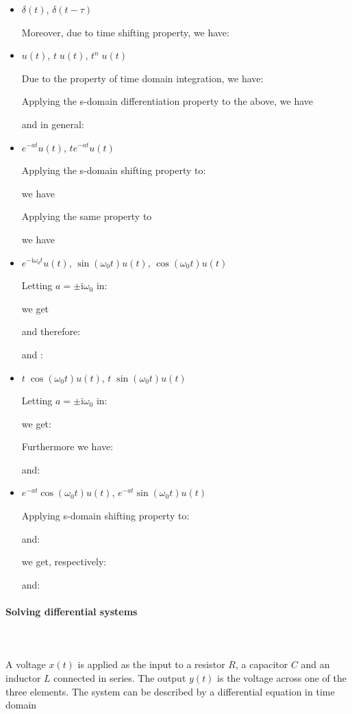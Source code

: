 	\begin{itemize}
	\item $\delta(t)$, $\delta(t-\tau)$
	
	
	Moreover, due to time shifting property, we have:
	
	
	\item $u(t)$, $t\;u(t)$, $t^n\;u(t)$
	
	Due to the property of time domain integration, we have:
	
	Applying the s-domain differentiation property to the above, we have
	
	and in general:
	
	
	\item $e^{-at}u(t)$, $te^{-at}u(t)$
	
	Applying the s-domain shifting property to:
	
	we have
	
	Applying the same property to
	
	we have
	
	
	\item $e^{-\mathrm{i}\omega_0 t}u(t)$, $\sin(\omega_0 t)u(t)$, $\cos(\omega_0 t)u(t)$ 
	
	Letting $a=\pm \mathrm{i}\omega_0$ in:
	
	we get
	
	and therefore:
	
	and :
	
	
	\item $t\;\cos(\omega_0 t)u(t)$, $t\;\sin(\omega_0 t)u(t)$ 
	
	Letting $a=\pm \mathrm{i}\omega_0$ in:
	
	we get:
	
	Furthermore we have:
	
	and:
	
	
	\item $e^{-at}\cos(\omega_0 t) u(t)$,  $e^{-at}\sin(\omega_0 t) u(t)$  
	
	Applying s-domain shifting property to:
	
	and:
	
	we get, respectively:
	
	and:
	
	
	\end{itemize}
	
	\paragraph{Solving differential systems}\mbox{}\\\\
	 A voltage $x(t)$ is applied as the input to a resistor $R$, 
	a capacitor $C$ and an inductor $L$ connected in series. The output $y(t)$ is 
	the voltage across one of the three elements. The system can be described by a 
	differential equation in time domain
	
